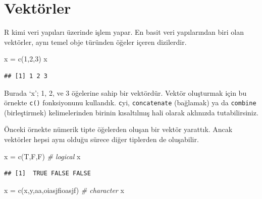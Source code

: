\documentclass[
]{book}
\newenvironment{Shaded}{\begin{snugshade}}{\end{snugshade}}
\newcommand{\CommentTok}[1]{\textcolor[rgb]{0.56,0.35,0.01}{\textit{#1}}}
\newcommand{\DecValTok}[1]{\textcolor[rgb]{0.00,0.00,0.81}{#1}}
\newcommand{\FunctionTok}[1]{\textcolor[rgb]{0.00,0.00,0.00}{#1}}
\newcommand{\NormalTok}[1]{#1}
\newcommand{\OtherTok}[1]{\textcolor[rgb]{0.56,0.35,0.01}{#1}}
\newcommand{\StringTok}[1]{\textcolor[rgb]{0.31,0.60,0.02}{#1}}
\begin{document}
\hypertarget{vektuxf6rler}{%
\chapter{Vektörler}\label{vektuxf6rler}}

R kimi veri yapıları üzerinde işlem yapar. En basit veri yapılarından biri olan vektörler, aynı temel obje türünden öğeler içeren dizilerdir.

\begin{Shaded}
\begin{Highlighting}[]
\NormalTok{x }\OtherTok{=} \FunctionTok{c}\NormalTok{(}\DecValTok{1}\NormalTok{,}\DecValTok{2}\NormalTok{,}\DecValTok{3}\NormalTok{)}
\NormalTok{x}
\end{Highlighting}
\end{Shaded}

\begin{verbatim}
## [1] 1 2 3
\end{verbatim}

Burada `x'; 1, 2, ve 3 öğelerine sahip bir vektördür. Vektör oluşturmak için bu örnekte \texttt{c()} fonksiyonunu kullandık. \texttt{c}yi, \texttt{concatenate} (bağlamak) ya da \texttt{combine} (birleştirmek) kelimelerinden birinin kısaltılmış hali olarak aklınızda tutabilirsiniz.

Önceki örnekte nümerik tipte öğelerden oluşan bir vektör yarattık. Ancak vektörler hepsi aynı olduğu sürece diğer tiplerden de oluşabilir.

\begin{Shaded}
\begin{Highlighting}[]
\NormalTok{x }\OtherTok{=} \FunctionTok{c}\NormalTok{(T,F,F) }\CommentTok{\# logical}
\NormalTok{x}
\end{Highlighting}
\end{Shaded}

\begin{verbatim}
## [1]  TRUE FALSE FALSE
\end{verbatim}

\begin{Shaded}
\begin{Highlighting}[]
\NormalTok{x }\OtherTok{=} \FunctionTok{c}\NormalTok{(}\StringTok{\textquotesingle{}x\textquotesingle{}}\NormalTok{,}\StringTok{\textquotesingle{}y\textquotesingle{}}\NormalTok{,}\StringTok{\textquotesingle{}aa\textquotesingle{}}\NormalTok{,}\StringTok{\textquotesingle{}oiasjfioasjf\textquotesingle{}}\NormalTok{) }\CommentTok{\# character}
\NormalTok{x}
\end{Highlighting}
\end{Shaded}
\end{document}
